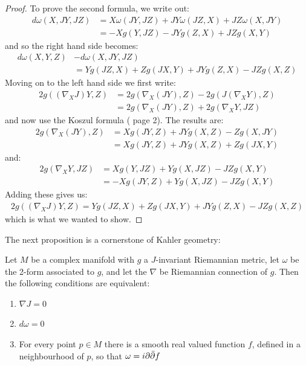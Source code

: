 \begin{proof}
To prove the second formula, we write out:
%
\begin{align*}
d \omega( X, JY, JZ ) &= X \omega( JY, JZ ) + JY \omega( JZ, X ) + JZ \omega( X, JY ) \\
&= - X g( Y, JZ ) - JY g( Z, X ) + JZ g( X, Y )
\end{align*}
%
and so the right hand side becomes:
%
\begin{align*}
d \omega( X, Y, Z ) &- d \omega( X, JY, JZ ) \\
&= Y g( JZ, X ) + Z g( JX, Y ) + JY g( Z, X ) - JZ g(X, Z)
\end{align*}
%
Moving on to the left hand side we first write:
%
\begin{align*}
2 g( (\nabla_X J)Y, Z ) &= 2 g( \nabla_X (JY), Z ) - 2 g( J( \nabla_X Y ), Z ) \\
&= 2 g( \nabla_X (JY), Z ) + 2 g( \nabla_X Y, JZ )
\end{align*}
%
and now use the Koszul formula (\cite{CE} page 2).  The results are:
%
\begin{align*}
2 g( \nabla_X (JY), Z ) &= X g( JY, Z ) + JY g( X, Z ) - Z g( X, JY ) \\
&= X g( JY, Z ) + JY g( X, Z ) + Z g( JX, Y ) 
\end{align*}
%
and:
%
\begin{align*}
2 g( \nabla_X Y, JZ ) &= X g( Y, JZ ) + Y g( X, JZ ) - JZ g( X, Y ) \\
&=  - X g( JY, Z ) + Y g( X, JZ ) - JZ g( X, Y )
\end{align*}
%
Adding these gives us:
%
\begin{align*}
2 g( (\nabla_X J)Y, Z ) = Y g( JZ, X ) + Z g( JX, Y ) + JY g( Z, X ) - JZ g(X, Z)
\end{align*}
%
which is what we wanted to show.
%
\end{proof}
%
The next proposition is a cornerstone of Kahler geometry:
%
\begin{prop} Let $M$ be a complex manifold with $g$ a $J$-invariant Riemannian metric, let $\omega$ be the 2-form associated to $g$, and let the $\nabla$ be Riemannian connection of $g$.  Then the following conditions are equivalent:
%
\begin{enumerate}
%
\item $ \nabla J = 0 $
%
\item $ d \omega = 0 $
%
\item For every point $p \in M$ there is a smooth real valued function $f$, defined in a neighbourhood of $p$, so that $ \omega = i \partial \bar{\partial} f$
%
\end{enumerate}
%
\end{prop}
